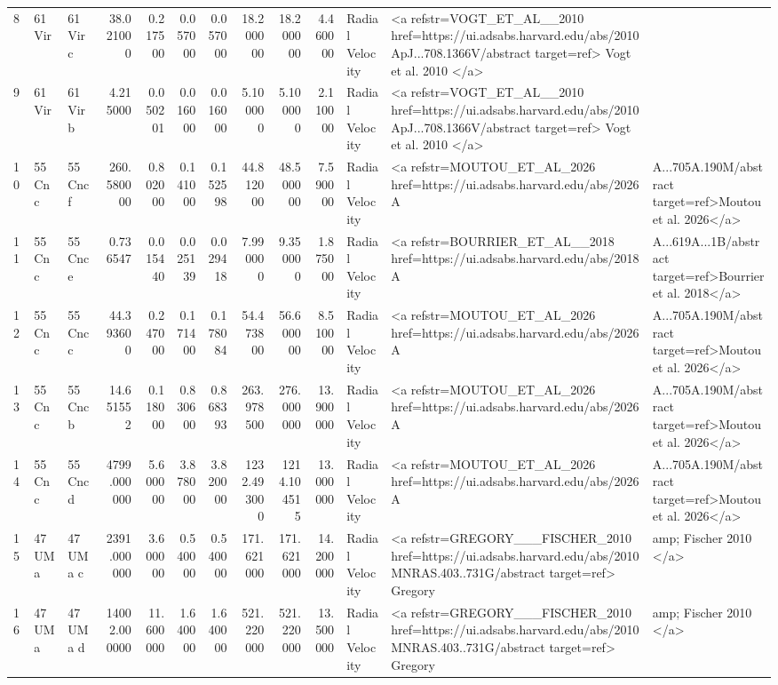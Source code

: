 \begin{tabular}{lllrrrrrrrll}
8 & 61 Vir & 61 Vir c & 38.021000 & 0.217500 & 0.057000 & 0.057000 & 18.200000 & 18.200000 & 4.460000 & Radial Velocity & <a refstr=VOGT_ET_AL__2010 href=https://ui.adsabs.harvard.edu/abs/2010ApJ...708.1366V/abstract target=ref> Vogt et al. 2010 </a> \\
9 & 61 Vir & 61 Vir b & 4.215000 & 0.050201 & 0.016000 & 0.016000 & 5.100000 & 5.100000 & 2.110000 & Radial Velocity & <a refstr=VOGT_ET_AL__2010 href=https://ui.adsabs.harvard.edu/abs/2010ApJ...708.1366V/abstract target=ref> Vogt et al. 2010 </a> \\
10 & 55 Cnc & 55 Cnc f & 260.580000 & 0.802000 & 0.141000 & 0.152598 & 44.812000 & 48.500000 & 7.590000 & Radial Velocity & <a refstr=MOUTOU_ET_AL_2026 href=https://ui.adsabs.harvard.edu/abs/2026A&A...705A.190M/abstract target=ref>Moutou et al. 2026</a> \\
11 & 55 Cnc & 55 Cnc e & 0.736547 & 0.015440 & 0.025139 & 0.029418 & 7.990000 & 9.350000 & 1.875000 & Radial Velocity & <a refstr=BOURRIER_ET_AL__2018 href=https://ui.adsabs.harvard.edu/abs/2018A&A...619A...1B/abstract target=ref>Bourrier et al. 2018</a> \\
12 & 55 Cnc & 55 Cnc c & 44.393600 & 0.247000 & 0.171400 & 0.178084 & 54.473800 & 56.600000 & 8.510000 & Radial Velocity & <a refstr=MOUTOU_ET_AL_2026 href=https://ui.adsabs.harvard.edu/abs/2026A&A...705A.190M/abstract target=ref>Moutou et al. 2026</a> \\
13 & 55 Cnc & 55 Cnc b & 14.651552 & 0.118000 & 0.830600 & 0.868393 & 263.978500 & 276.000000 & 13.900000 & Radial Velocity & <a refstr=MOUTOU_ET_AL_2026 href=https://ui.adsabs.harvard.edu/abs/2026A&A...705A.190M/abstract target=ref>Moutou et al. 2026</a> \\
14 & 55 Cnc & 55 Cnc d & 4799.000000 & 5.600000 & 3.878000 & 3.820000 & 1232.493000 & 1214.104515 & 13.000000 & Radial Velocity & <a refstr=MOUTOU_ET_AL_2026 href=https://ui.adsabs.harvard.edu/abs/2026A&A...705A.190M/abstract target=ref>Moutou et al. 2026</a> \\
15 & 47 UMa & 47 UMa c & 2391.000000 & 3.600000 & 0.540000 & 0.540000 & 171.621000 & 171.621000 & 14.200000 & Radial Velocity & <a refstr=GREGORY___FISCHER_2010 href=https://ui.adsabs.harvard.edu/abs/2010MNRAS.403..731G/abstract target=ref> Gregory &amp; Fischer 2010 </a> \\
16 & 47 UMa & 47 UMa d & 14002.000000 & 11.600000 & 1.640000 & 1.640000 & 521.220000 & 521.220000 & 13.500000 & Radial Velocity & <a refstr=GREGORY___FISCHER_2010 href=https://ui.adsabs.harvard.edu/abs/2010MNRAS.403..731G/abstract target=ref> Gregory &amp; Fischer 2010 </a> \\

\end{tabular}
